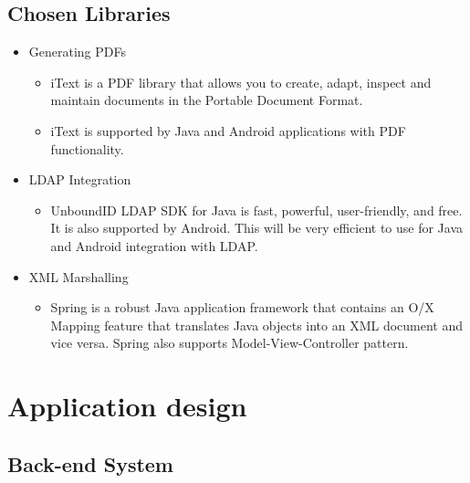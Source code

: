 \documentclass[12pt,a4paper]{article}
\begin{document}
\subsection{Chosen Libraries}
\begin{itemize}
	\item Generating PDFs
		\begin{itemize}
			\item iText is a PDF library that allows you to create, adapt, inspect and maintain documents in the Portable Document Format.
			\item iText is supported by Java and Android applications with PDF functionality.
		\end{itemize}
	\item LDAP Integration
		\begin{itemize}
			\item UnboundID LDAP SDK for Java is fast, powerful, user-friendly, and free. It is also supported by Android. This will be very efficient to use for Java and Android integration with LDAP.
		\end{itemize}
	\item XML Marshalling
		\begin{itemize}
			\item Spring is a robust Java application framework that contains an O/X Mapping feature that translates Java objects into an XML document and vice versa. Spring also supports Model-View-Controller pattern.
		\end{itemize}
\end{itemize}
\pagebreak
\section{Application design}
\subsection{Back-end System}
\end{document}
